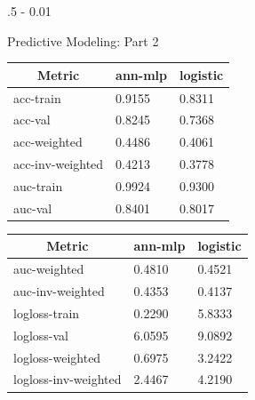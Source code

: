\documentclass{postertheme}\usepackage[]{graphicx}\usepackage[]{color}
\begin{document}
\begin{frame}
\begin{columns}[onlytextwidth]
\begin{column}{.5 \textwidth - 0.01 \textwidth}
\begin{block}{Predictive Modeling: Part 2}
      \begin{table}[h]
      \small
      \begin{minipage}[h]{0.49\textwidth}
        \centering
        \begin{tabular}{@{}lll@{}}
            \hline
            \multicolumn{1}{c}{\textbf{Metric}} & \multicolumn{1}{c}{\textbf{ann-mlp}} &
            \multicolumn{1}{c}{\textbf{logistic}} \\ \hline
            acc-train & 0.9155 & 0.8311 \\ \hline
            acc-val & 0.8245 & 0.7368 \\ \hline
            acc-weighted & 0.4486 & 0.4061 \\ \hline
            acc-inv-weighted & 0.4213 & 0.3778 \\ \hline
            auc-train & 0.9924 & 0.9300 \\ \hline
            auc-val & 0.8401 & 0.8017 \\ \hline
        \end{tabular}
      \end{minipage}
      \begin{minipage}[h]{0.49\textwidth}
        \centering
        \begin{tabular}{@{}lll@{}}
            \hline
            \multicolumn{1}{c}{\textbf{Metric}} & \multicolumn{1}{c}{\textbf{ann-mlp}} &
            \multicolumn{1}{c}{\textbf{logistic}} \\ \hline
            auc-weighted & 0.4810 & 0.4521 \\ \hline
            auc-inv-weighted & 0.4353 & 0.4137 \\ \hline
            logloss-train & 0.2290 & 5.8333 \\ \hline
            logloss-val & 6.0595 & 9.0892 \\ \hline
            logloss-weighted & 0.6975 & 3.2422 \\ \hline
            logloss-inv-weighted & 2.4467 & 4.2190 \\ \hline
        \end{tabular}
      \end{minipage}
\end{table}
      
    \end{block}
  \end{column}
  
\end{columns}



\end{frame}
\end{document}
